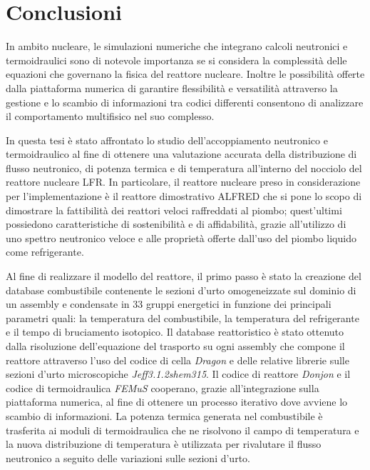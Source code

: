 \chapter*{Conclusioni}
In ambito nucleare, le simulazioni numeriche che integrano calcoli neutronici e 
termoidraulici sono di notevole importanza se si considera la complessità delle 
equazioni che governano la fisica del reattore nucleare.
Inoltre le possibilità offerte dalla piattaforma numerica di garantire 
flessibilità e versatilità attraverso la gestione e lo scambio di informazioni tra 
codici differenti consentono di analizzare il comportamento multifisico nel suo 
complesso.

In questa tesi è stato affrontato lo studio dell'accoppiamento neutronico e 
termoidraulico al fine di ottenere una valutazione accurata della distribuzione 
di flusso neutronico, di potenza termica e di temperatura all'interno del 
nocciolo del reattore nucleare LFR.
In particolare, il reattore nucleare preso in considerazione per 
l'implementazione è il reattore dimostrativo ALFRED che si pone lo scopo di 
dimostrare la fattibilità dei reattori veloci raffreddati al piombo; 
quest'ultimi possiedono caratteristiche di sostenibilità e di affidabilità, 
grazie all'utilizzo di uno spettro neutronico veloce e alle proprietà offerte 
dall'uso del piombo liquido come refrigerante.

Al fine di realizzare il modello del reattore, il primo passo è stato la 
creazione del database combustibile contenente le sezioni d'urto 
omogeneizzate sul dominio di un assembly e condensate in 33 gruppi energetici in 
funzione dei principali parametri quali: la temperatura del combustibile, la 
temperatura del refrigerante e il tempo di bruciamento isotopico.
Il database reattoristico è stato ottenuto dalla risoluzione dell'equazione del 
trasporto su ogni assembly che compone il reattore attraverso l'uso del codice 
di cella \textit{Dragon} e delle relative librerie sulle sezioni d'urto 
microscopiche \textit{Jeff3.1.2shem315}.
Il codice di reattore \textit{Donjon} e il codice di termoidraulica 
\textit{FEMuS} cooperano, grazie all'integrazione sulla piattaforma numerica, al 
fine di ottenere un processo iterativo dove avviene lo scambio di informazioni. 
La potenza termica generata nel combustibile è trasferita ai moduli 
di termoidraulica che ne risolvono il campo di temperatura e la nuova 
distribuzione di temperatura è utilizzata per rivalutare il flusso neutronico a 
seguito delle variazioni sulle sezioni d'urto.

